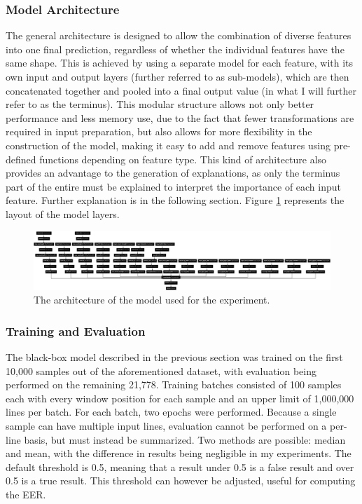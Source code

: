 \documentclass{article}
\begin{document}
			\subsubsection{Model Architecture}
			The general architecture is designed to allow the combination of diverse features into
			one final prediction, regardless of whether the individual features have the same
			shape. This is achieved by using a separate model for each feature, with its own input
			and output layers (further referred to as sub-models), which are then concatenated
			together and pooled into a final output value (in what I will further refer to as the
			terminus). This modular structure allows not only better performance and less memory
			use, due to the fact that fewer transformations are required in input preparation, but
			also allows for more flexibility in the construction of the model, making it easy to
			add and remove features using pre-defined functions depending on feature type. This
			kind of architecture also provides an advantage to the generation of explanations, as
			only the terminus part of the entire must be explained to interpret the importance of
			each input feature. Further explanation is in the following section. Figure
			\ref{fig:model_plot} represents the layout of the model layers.
			\begin{figure}[htbp]
				\begin{center}
					\includegraphics[width=1\textwidth]{images/model_plot.png}
					\caption{The architecture of the model used for the experiment.}
					\label{fig:model_plot}
				\end{center}
			\end{figure}
			\subsubsection{Training and Evaluation}
			The black-box model described in the previous section was trained on the first 10,000
			samples out of the aforementioned dataset, with evaluation being performed on the
			remaining 21,778. Training batches consisted of 100 samples each with every window
			position for each sample and an upper limit of 1,000,000 lines per batch. For each
			batch, two epochs were performed. Because a single sample can have multiple input
			lines, evaluation cannot be performed on a per-line basis, but must instead be
			summarized. Two methods are possible: median and mean, with the difference in results
			being negligible in my experiments. The default threshold is 0.5, meaning that a
			result under 0.5 is a false result and over 0.5 is a true result. This threshold can
			however be adjusted, useful for computing the EER.
\end{document}
